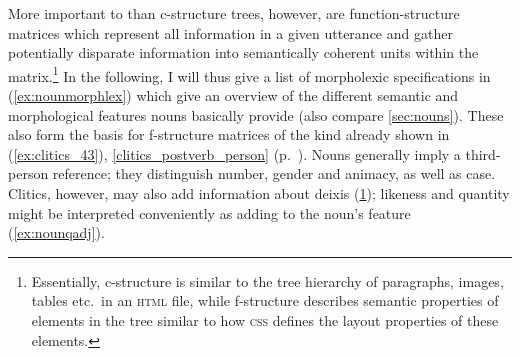 More important to \Lfg{} than c-structure trees, however, are
function-structure matrices which represent all information in a given
utterance and gather potentially disparate information into semantically
coherent units within the matrix.\footnote{Essentially, c-structure is similar
to the tree hierarchy of paragraphs, images, tables etc.\ in an \textsc{html}
file, while f-structure describes semantic properties of elements in the tree
similar to how \textsc{css} defines the layout properties of these elements.}
In the following, I will thus give a list of morpholexic specifications in
(\ref{ex:nounmorphlex}) which give an overview of the different semantic and
morphological features nouns basically provide (also compare
\autoref{sec:nouns}). These also form the basis for f-structure matrices of the
kind already shown in (\ref{ex:clitics_43}),
\autoref{clitics_postverb_person} (p.~\pageref{ex:clitics_43}). Nouns generally
imply a third-person reference; they distinguish number, gender and animacy, as
well as case. Clitics, however, may also add information about deixis
(\ref{ex:deixisfeat}); likeness and quantity might be interpreted conveniently
as adding to the noun's \Adjc{} feature (\ref{ex:nounqadj}).

\begin{figure}[h]
\begin{morphlex}
\pex\label{ex:nounmorphlex}%
\a{}

\a\label{ex:deixisfeat}
\xe
\end{morphlex}
\end{figure}

